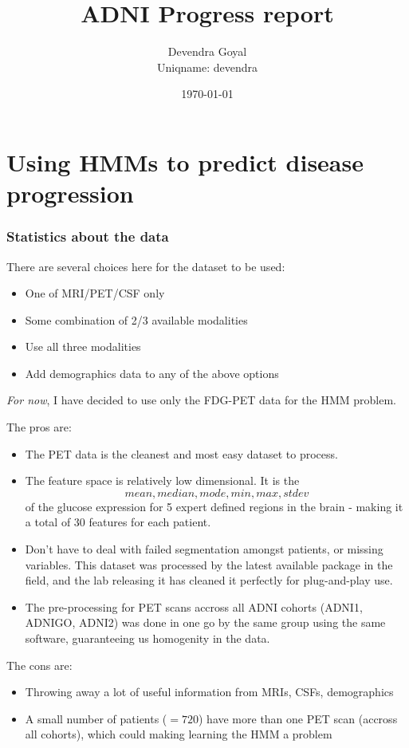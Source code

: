 \documentclass[12pt,a4paper]{article}
\title{ADNI Progress report}
\author{Devendra Goyal\\Uniqname: devendra}
\date{\today}
\begin{document}
\maketitle

\part{Using HMMs to predict disease progression}

\section{Statistics about the data}
\label{sec:data}

There are several choices here for the dataset to be used:

\begin{itemize}
\item One of MRI/PET/CSF only
\item Some combination of 2/3 available modalities
\item Use all three modalities
\item Add demographics data to any of the above options
\end{itemize}

\emph{For now}, I have decided to use only the FDG-PET data for the
HMM problem. 

The pros are:

\begin{itemize}
\item The PET data is the cleanest and most easy dataset to process.
\item The feature space is relatively low dimensional. It is
  the \[mean, median, mode, min, max, stdev\] of the glucose
  expression for 5 expert defined regions in the brain - making it a
  total of 30 features for each patient.
\item Don't have to deal with failed segmentation amongst patients, or
  missing variables. This dataset was processed by the latest
  available package in the field, and the lab releasing it has cleaned
  it perfectly for plug-and-play use.
\item The pre-processing for PET scans accross all ADNI cohorts
  (ADNI1, ADNIGO, ADNI2) was done in one go by the same group using
  the same software, guaranteeing us homogenity in the data.
\end{itemize}

The cons are:

\begin{itemize}
\item Throwing away a lot of useful information from MRIs, CSFs, demographics
\item A small number of patients ($=720$) have more than one PET scan
  (accross all cohorts), which
  could making learning the HMM a problem
\end{itemize}
\end{document}
